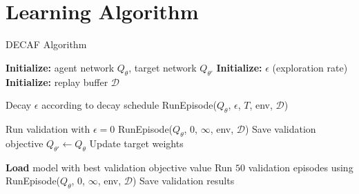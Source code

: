 


\section{Learning Algorithm}
\label{sec:appendixAlgo}

\begin{algorithm}
\caption{DECAF Algorithm}
\label{alg:main_loop}
\begin{algorithmic}[1]
\State \textbf{Initialize:} agent network $Q_{\theta}$, target network $Q_{\theta'}$
\State \textbf{Initialize:} $\epsilon$ (exploration rate)
\State \textbf{Initialize:} replay buffer $\mathcal{D}$

    \State Decay $\epsilon$ according to decay schedule    
    \State RunEpisode($Q_{\theta}$, $\epsilon$, $T$, env, $\mathcal{D}$)

        \Comment Run validation with $\epsilon = 0$
        \State RunEpisode($Q_{\theta}$, 0, $\infty$, env, $\mathcal{D}$)
        \Comment Save validation objective
    \EndIf
        \State $Q_{\theta'}\leftarrow Q_{\theta}$
        \Comment Update target weights
    \EndIf
    
\EndFor

\State \textbf{Load} model with best validation objective value
\State Run $50$ validation episodes using RunEpisode($Q_{\theta}$, $ 0$, $\infty$, env, $\mathcal{D}$)
\State Save validation results

\end{algorithmic}
\end{algorithm}

